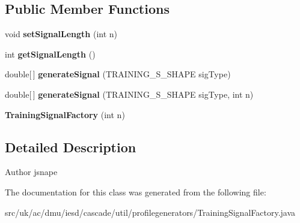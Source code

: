 \subsection*{Public Member Functions}
\begin{DoxyCompactItemize}
\item 
\hypertarget{classuk_1_1ac_1_1dmu_1_1iesd_1_1cascade_1_1util_1_1profilegenerators_1_1_training_signal_factory_a7faf67c292f503c631c3b5a9e327b105}{void {\bfseries set\-Signal\-Length} (int n)}\label{classuk_1_1ac_1_1dmu_1_1iesd_1_1cascade_1_1util_1_1profilegenerators_1_1_training_signal_factory_a7faf67c292f503c631c3b5a9e327b105}

\item 
\hypertarget{classuk_1_1ac_1_1dmu_1_1iesd_1_1cascade_1_1util_1_1profilegenerators_1_1_training_signal_factory_a5f01f6a9577f3c6b754da05d15ac9141}{int {\bfseries get\-Signal\-Length} ()}\label{classuk_1_1ac_1_1dmu_1_1iesd_1_1cascade_1_1util_1_1profilegenerators_1_1_training_signal_factory_a5f01f6a9577f3c6b754da05d15ac9141}

\item 
\hypertarget{classuk_1_1ac_1_1dmu_1_1iesd_1_1cascade_1_1util_1_1profilegenerators_1_1_training_signal_factory_a230da06eac943af857a93f373ed9b591}{double\mbox{[}$\,$\mbox{]} {\bfseries generate\-Signal} (T\-R\-A\-I\-N\-I\-N\-G\-\_\-\-S\-\_\-\-S\-H\-A\-P\-E sig\-Type)}\label{classuk_1_1ac_1_1dmu_1_1iesd_1_1cascade_1_1util_1_1profilegenerators_1_1_training_signal_factory_a230da06eac943af857a93f373ed9b591}

\item 
\hypertarget{classuk_1_1ac_1_1dmu_1_1iesd_1_1cascade_1_1util_1_1profilegenerators_1_1_training_signal_factory_ae68df4169ba9d7eab6ba1cb8d2880ac3}{double\mbox{[}$\,$\mbox{]} {\bfseries generate\-Signal} (T\-R\-A\-I\-N\-I\-N\-G\-\_\-\-S\-\_\-\-S\-H\-A\-P\-E sig\-Type, int n)}\label{classuk_1_1ac_1_1dmu_1_1iesd_1_1cascade_1_1util_1_1profilegenerators_1_1_training_signal_factory_ae68df4169ba9d7eab6ba1cb8d2880ac3}

\item 
\hypertarget{classuk_1_1ac_1_1dmu_1_1iesd_1_1cascade_1_1util_1_1profilegenerators_1_1_training_signal_factory_a66391639b5e8289943e84f15b3c273bc}{{\bfseries Training\-Signal\-Factory} (int n)}\label{classuk_1_1ac_1_1dmu_1_1iesd_1_1cascade_1_1util_1_1profilegenerators_1_1_training_signal_factory_a66391639b5e8289943e84f15b3c273bc}

\end{DoxyCompactItemize}


\subsection{Detailed Description}
\begin{DoxyAuthor}{Author}
jsnape 
\end{DoxyAuthor}


The documentation for this class was generated from the following file\-:\begin{DoxyCompactItemize}
\item 
src/uk/ac/dmu/iesd/cascade/util/profilegenerators/Training\-Signal\-Factory.\-java\end{DoxyCompactItemize}
